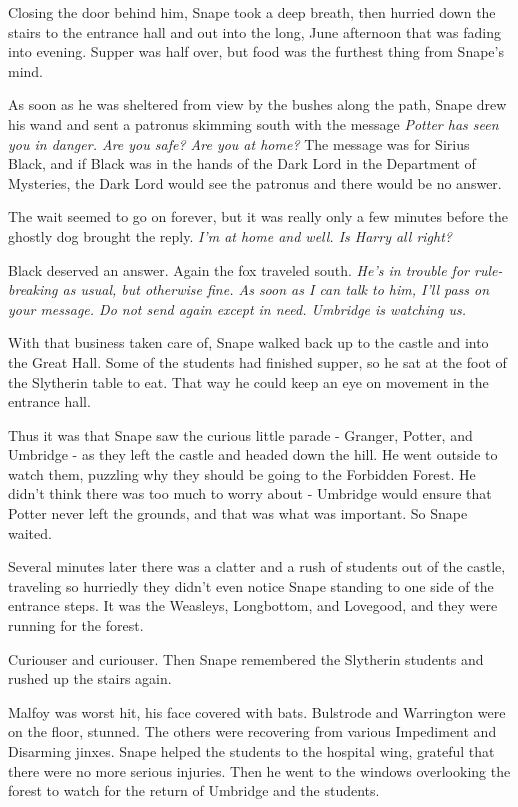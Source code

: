 Closing the door behind him, Snape took a deep breath, then hurried down the stairs to the entrance hall and out into the long, June afternoon that was fading into evening. Supper was half over, but food was the furthest thing from Snape's mind.

As soon as he was sheltered from view by the bushes along the path, Snape drew his wand and sent a patronus skimming south with the message \emph{Potter has seen you in danger. Are you safe? Are you at home?} The message was for Sirius Black, and if Black was in the hands of the Dark Lord in the Department of Mysteries, the Dark Lord would see the patronus and there would be no answer.

The wait seemed to go on forever, but it was really only a few minutes before the ghostly dog brought the reply. \emph{I'm at home and well. Is Harry all right?}

Black deserved an answer. Again the fox traveled south. \emph{He's in trouble for rule-breaking as usual, but otherwise fine. As soon as I can talk to him, I'll pass on your message. Do not send again except in need. Umbridge is watching us.}

With that business taken care of, Snape walked back up to the castle and into the Great Hall. Some of the students had finished supper, so he sat at the foot of the Slytherin table to eat. That way he could keep an eye on movement in the entrance hall.

Thus it was that Snape saw the curious little parade - Granger, Potter, and Umbridge - as they left the castle and headed down the hill. He went outside to watch them, puzzling why they should be going to the Forbidden Forest. He didn't think there was too much to worry about - Umbridge would ensure that Potter never left the grounds, and that was what was important. So Snape waited.

Several minutes later there was a clatter and a rush of students out of the castle, traveling so hurriedly they didn't even notice Snape standing to one side of the entrance steps. It was the Weasleys, Longbottom, and Lovegood, and they were running for the forest.

Curiouser and curiouser. Then Snape remembered the Slytherin students and rushed up the stairs again.

Malfoy was worst hit, his face covered with bats. Bulstrode and Warrington were on the floor, stunned. The others were recovering from various Impediment and Disarming jinxes. Snape helped the students to the hospital wing, grateful that there were no more serious injuries. Then he went to the windows overlooking the forest to watch for the return of Umbridge and the students.

